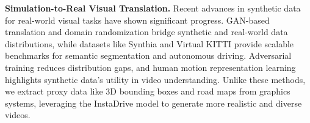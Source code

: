 \noindent \textbf{Simulation-to-Real Visual Translation.}  
Recent advances in synthetic data for real-world visual tasks have shown significant progress. GAN-based translation \cite{guo2020gan} and domain randomization \cite{tobin2017domain} bridge synthetic and real-world data distributions, while datasets like Synthia \cite{ros2016synthia} and Virtual KITTI \cite{cabon2020virtual} provide scalable benchmarks for semantic segmentation and autonomous driving. Adversarial training \cite{shrivastava2017learning, zhang2018collaborative} reduces distribution gaps, and human motion representation learning \cite{guo2022learning} highlights synthetic data’s utility in video understanding. Unlike these methods, we extract proxy data like 3D bounding boxes and road maps from graphics systems, leveraging the InstaDrive model to generate more realistic and diverse videos.
